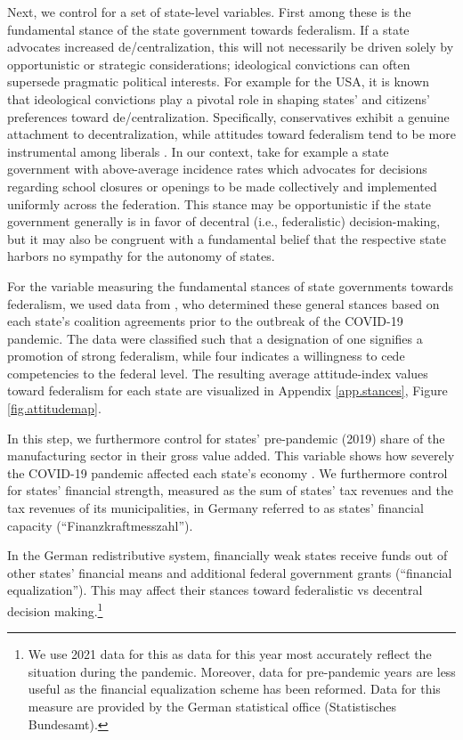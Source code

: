 \documentclass[12pt, abstract=true]{scrartcl}
\begin{document}
Next, we control for a set of state-level variables. First among these is the fundamental stance of the state government towards federalism. If a state advocates increased de/centralization, this will not necessarily be driven solely by opportunistic or strategic considerations; ideological convictions can often supersede pragmatic political interests. For example for the USA, it is known that ideological convictions play a pivotal role in shaping states' and citizens' preferences toward de/centralization. Specifically, conservatives exhibit a genuine attachment to decentralization, while attitudes toward federalism tend to be more instrumental among liberals \citep{Glaser2023, Rendleman2022}. In our context, take for example a state government with above-average incidence rates which advocates for decisions regarding school closures or openings to be made collectively and implemented uniformly across the federation. This stance may be opportunistic if the state government generally is in favor of decentral (i.e., federalistic) decision-making, but it may also be congruent with a fundamental belief that the respective state harbors no sympathy for the autonomy of states.

For the variable measuring the fundamental stances of state governments towards federalism, we used data from \cite{BarbaroRode2024}, who determined these general stances based on each state's coalition agreements prior to the outbreak of the COVID-19 pandemic. The data were classified such that a designation of one signifies a promotion of strong federalism, while four indicates a willingness to cede competencies to the federal level. The resulting average attitude-index values toward federalism for each state are visualized in Appendix \ref{app.stances}, Figure \ref{fig.attitudemap}. 

In this step, we furthermore control for states’ pre-pandemic (2019) share of the manufacturing sector in their gross value added. This variable shows how severely the COVID-19 pandemic affected each state's economy \citep{Flach2020}. We furthermore control for states’ financial strength, measured as the sum of states’ tax revenues and the tax revenues of its municipalities, in Germany referred to as states’ financial capacity (“Finanzkraftmesszahl”). 

In the German redistributive system, financially weak states receive funds out of other states' financial means and additional federal government grants (“financial equalization”). This may affect their stances toward federalistic vs decentral decision making.\footnote{
	We use 2021 data for this as data for this year most accurately reflect the situation during the pandemic. Moreover, data for pre-pandemic years are less useful as the financial equalization scheme has been reformed. Data for this measure are provided by the German statistical office (Statistisches Bundesamt).
}  
\end{document}
